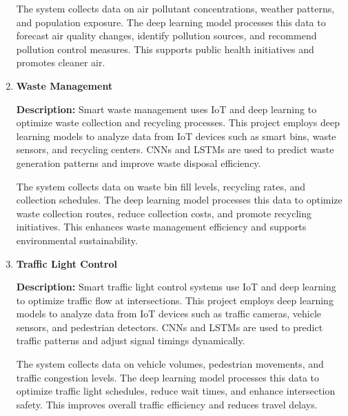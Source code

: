 \documentclass{article}
\begin{document}
\begin{enumerate}[label=\textbf{\arabic*.}, leftmargin=*]
The system collects data on air pollutant concentrations, weather patterns, and population exposure. The deep learning model processes this data to forecast air quality changes, identify pollution sources, and recommend pollution control measures. This supports public health initiatives and promotes cleaner air.



\vspace{24pt} %
\item \textbf{Waste Management}

\textbf{Description:}
Smart waste management uses IoT and deep learning to optimize waste collection and recycling processes. This project employs deep learning models to analyze data from IoT devices such as smart bins, waste sensors, and recycling centers. CNNs and LSTMs are used to predict waste generation patterns and improve waste disposal efficiency.

The system collects data on waste bin fill levels, recycling rates, and collection schedules. The deep learning model processes this data to optimize waste collection routes, reduce collection costs, and promote recycling initiatives. This enhances waste management efficiency and supports environmental sustainability.



\vspace{24pt} %
\item \textbf{Traffic Light Control}

\textbf{Description:}
Smart traffic light control systems use IoT and deep learning to optimize traffic flow at intersections. This project employs deep learning models to analyze data from IoT devices such as traffic cameras, vehicle sensors, and pedestrian detectors. CNNs and LSTMs are used to predict traffic patterns and adjust signal timings dynamically.

The system collects data on vehicle volumes, pedestrian movements, and traffic congestion levels. The deep learning model processes this data to optimize traffic light schedules, reduce wait times, and enhance intersection safety. This improves overall traffic efficiency and reduces travel delays.


\end{enumerate}
\end{document}
